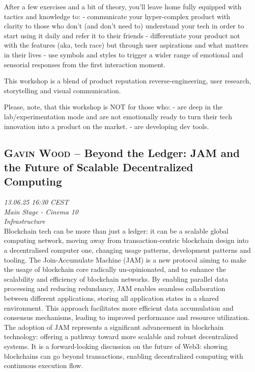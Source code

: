 After a few exercises and a bit of theory, you'll leave home fully equipped with tactics and knowledge to: 
- communicate your hyper-complex product with clarity to those who don't (and don't need to) understand your tech in order to start using it daily and refer it to their friends 
- differentiate your product not with the features (aka, tech race) but through user aspirations and what matters in their lives
- use symbols and styles to trigger a wider range of emotional and sensorial responses from the first interaction moment.

This workshop is a blend of product reputation reverse-engineering, user research, storytelling and visual communication.

Please, note, that this workshop is NOT for those who:
- are deep in the lab/experimentation mode and are not emotionally ready to turn their tech innovation into a product on the market.
- are developing dev tools.

\clearpage
\subsection {\textsc{Gavin Wood}  -- Beyond the Ledger: JAM and the Future of Scalable Decentralized Computing} \noindent \textit {13.06.25 16:30 CEST\\ Main Stage - Cinema 10\\ Infrastructure}\\[1em] Blockchain tech can be more than just a ledger: it can be a scalable global computing network, moving away from transaction-centric blockchain design into a decentralised computer one, changing usage patterns, development patterns and tooling. The Join-Accumulate Machine (JAM) is a new protocol aiming to make the usage of blockchain core radically un-opinionated, and to enhance the scalability and efficiency of blockchain networks. By enabling parallel data processing and reducing redundancy, JAM enables seamless collaboration between different applications, storing all application states in a shared environment. This approach facilitates more efficient data accumulation and consensus mechanisms, leading to improved performance and resource utilization. The adoption of JAM represents a significant advancement in blockchain technology: offering a pathway toward more scalable and robust decentralized systems. It is a forward-looking discussion on the future of Web3: showing blockchains can go beyond transactions, enabling decentralized computing with continuous execution flow.

